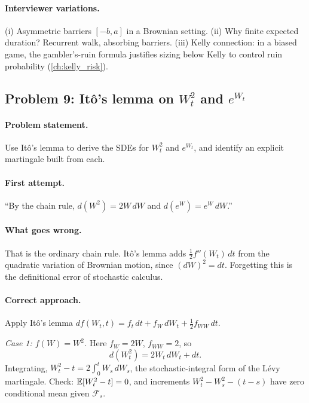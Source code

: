 \paragraph{Interviewer variations.}
(i) Asymmetric barriers $[-b, a]$ in a Brownian setting.  (ii)
Why finite expected duration?  Recurrent walk, absorbing
barriers.  (iii) Kelly connection: in a biased game, the
gambler's-ruin formula justifies sizing below Kelly to control
ruin probability (\cref{ch:kelly_risk}).

\subsection{Problem 9: It\^o's lemma on $W_t^2$ and $e^{W_t}$}
\label{sec:ito}

\paragraph{Problem statement.}
Use It\^o's lemma to derive the SDEs for $W_t^2$ and $e^{W_t}$,
and identify an explicit martingale built from each.

\paragraph{First attempt.}
``By the chain rule, $d(W^2) = 2W\,dW$ and $d(e^W) = e^W\,dW$.''

\paragraph{What goes wrong.}
That is the ordinary chain rule.  It\^o's lemma adds
$\tfrac{1}{2} f''(W_t)\,dt$ from the quadratic variation of
Brownian motion, since $(dW)^2 = dt$.  Forgetting this is the
definitional error of stochastic calculus.

\paragraph{Correct approach.}
Apply It\^o's lemma $df(W_t, t) = f_t\,dt + f_W\,dW_t
+ \tfrac{1}{2} f_{WW}\,dt$.

\emph{Case 1: $f(W) = W^2$.}  Here $f_W = 2W$, $f_{WW} = 2$, so
\[
d(W_t^2) = 2 W_t\,dW_t + dt.
\]
Integrating, $W_t^2 - t = 2\int_0^t W_s\,dW_s$, the
stochastic-integral form of the L\'evy martingale.  Check:
$\mathbb{E}[W_t^2 - t] = 0$, and increments $W_t^2 - W_s^2 - (t-s)$ have
zero conditional mean given $\mathcal F_s$.


